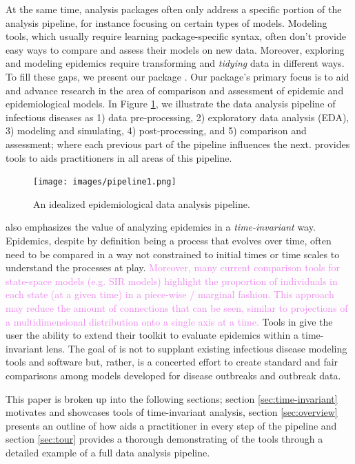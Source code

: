 \documentclass[
  shortnames]{jss}
\begin{document}
At the same time, analysis packages often only address a specific
portion of the analysis pipeline, for instance focusing on certain types
of models. Modeling tools, which usually require learning
package-specific syntax, often don't provide easy ways to compare and
assess their models on new data. Moreover, exploring and modeling
epidemics require transforming and \textit{tidying} data in different
ways. To fill these gaps, we present our  package
. Our package's primary focus is to aid and advance
research in the area of comparison and assessment of epidemic and
epidemiological models. In Figure \ref{fig:pipeline}, we illustrate the
data analysis pipeline of infectious diseases as 1) data pre-processing,
2) exploratory data analysis (EDA), 3) modeling and simulating, 4)
post-processing, and 5) comparison and assessment; where each previous
part of the pipeline influences the next.  provides
tools to aids practitioners in all areas of this pipeline.

\begin{figure}[!ht]
    \centering
    \texttt{[image: images/pipeline1.png]}
    \caption{An idealized epidemiological data analysis pipeline.}
    \label{fig:pipeline}
\end{figure}

 also emphasizes the value of analyzing epidemics in a
\textit{time-invariant} way. Epidemics, despite by definition being a
process that evolves over time, often need to be compared in a way not
constrained to initial times or time scales to understand the processes
at play.
\textcolor{violet}{Moreover, many current comparison tools for state-space models (e.g. SIR models) highlight the proportion of individuals in each state (at a given time) in a piece-wise / marginal  fashion. This approach may reduce the amount of connections that can be seen, similar to projections of a multidimensional distribution onto a single axis at a time.}
Tools in  give the user the ability to extend their
toolkit to evaluate epidemics within a time-invariant lens. The goal of
 is not to supplant existing infectious disease modeling
tools and software but, rather, is a concerted effort to create standard
and fair comparisons among models developed for disease outbreaks and
outbreak data.

This paper is broken up into the following sections; section
\ref{sec:time-invariant} motivates and showcases tools of time-invariant
analysis, section \ref{sec:overview} presents an outline of how
 aids a practitioner in every step of the pipeline and
section \ref{sec:tour} provides a thorough demonstrating of the tools
through a detailed example of a full data analysis pipeline.
\end{document}
